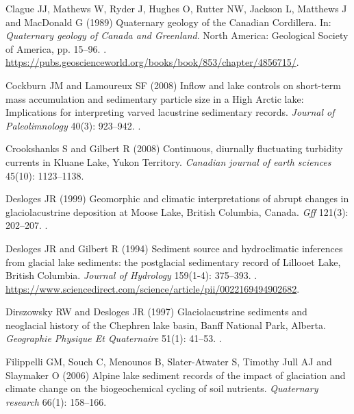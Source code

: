 \documentclass[Royal,times,doublespace,sageh]{sagej}
\begin{document}
\begin{thebibliography}{69}
Clague JJ, Mathews W, Ryder J, Hughes O, Rutter NW, Jackson L, Matthews J and
  MacDonald G (1989) {Quaternary geology of the Canadian Cordillera}.
\newblock In: \emph{Quaternary geology of Canada and Greenland}. North America:
  Geological Society of America, pp. 15--96.
\newblock {}.
\newblock
  \urlprefix\url{https://pubs.geoscienceworld.org/books/book/853/chapter/4856715/}.

Cockburn JM and Lamoureux SF (2008) {Inflow and lake controls on short-term
  mass accumulation and sedimentary particle size in a High Arctic lake:
  Implications for interpreting varved lacustrine sedimentary records}.
\newblock \emph{Journal of Paleolimnology} 40(3): 923--942.
\newblock {}.

Crookshanks S and Gilbert R (2008) {Continuous, diurnally fluctuating turbidity
  currents in Kluane Lake, Yukon Territory}.
\newblock \emph{Canadian journal of earth sciences} 45(10): 1123--1138.

Desloges JR (1999) {Geomorphic and climatic interpretations of abrupt changes
  in glaciolacustrine deposition at Moose Lake, British Columbia, Canada}.
\newblock \emph{Gff} 121(3): 202--207.
\newblock {}.

Desloges JR and Gilbert R (1994) {Sediment source and hydroclimatic inferences
  from glacial lake sediments: the postglacial sedimentary record of Lillooet
  Lake, British Columbia}.
\newblock \emph{Journal of Hydrology} 159(1-4): 375--393.
\newblock {}.
\newblock
  \urlprefix\url{https://www.sciencedirect.com/science/article/pii/0022169494902682}.

Dirszowsky RW and Desloges JR (1997) {Glaciolacustrine sediments and neoglacial
  history of the Chephren lake basin, Banff National Park, Alberta}.
\newblock \emph{Geographie Physique Et Quaternaire} 51(1): 41--53.
\newblock {}.

Filippelli GM, Souch C, Menounos B, Slater-Atwater S, {Timothy Jull} AJ and
  Slaymaker O (2006) {Alpine lake sediment records of the impact of glaciation
  and climate change on the biogeochemical cycling of soil nutrients}.
\newblock \emph{Quaternary research} 66(1): 158--166.


\end{thebibliography}
\end{document}
